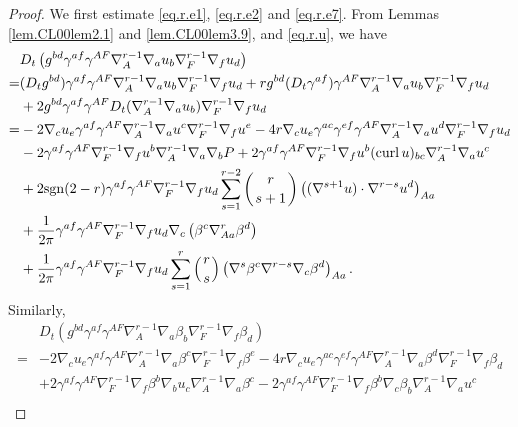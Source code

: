 \documentclass[12pt,reqno]{amsart}
\numberwithin{equation}{section}
\theoremstyle{definition}
\theoremstyle{remark}
\begin{document}
\begin{proof}
We first estimate  \eqref{eq.r.e1}, \eqref{eq.r.e2} and \eqref{eq.r.e7}.  From Lemmas \ref{lem.CL00lem2.1} and \ref{lem.CL00lem3.9}, and \eqref{eq.r.u}, we have
\begin{align*}
  &D_t\left(g^{bd}\gamma^{af}\gamma^{AF}{\nabla}_A^{r-1}{\nabla}_a u_b{\nabla}_F^{r-1}{\nabla}_f u_d\right)\\
  =&(D_tg^{bd})\gamma^{af}\gamma^{AF}{\nabla}_A^{r-1}{\nabla}_a u_b{\nabla}_F^{r-1}{\nabla}_f u_d+rg^{bd}(D_t\gamma^{af})\gamma^{AF}{\nabla}_A^{r-1}{\nabla}_a u_b{\nabla}_F^{r-1}{\nabla}_f u_d\\
  &+2g^{bd}\gamma^{af}\gamma^{AF}D_t({\nabla}_A^{r-1}{\nabla}_a u_b){\nabla}_F^{r-1}{\nabla}_f u_d\\
  =&-2{\nabla}_c u_e\gamma^{af}\gamma^{AF}{\nabla}_A^{r-1}{\nabla}_a u^c{\nabla}_F^{r-1}{\nabla}_f u^e-4r{\nabla}_c u_e\gamma^{ac}\gamma^{ef}\gamma^{AF}{\nabla}_A^{r-1}{\nabla}_a u^d{\nabla}_F^{r-1}{\nabla}_f u_d\\
  &-2\gamma^{af}\gamma^{AF}{\nabla}_F^{r-1}{\nabla}_f u^b{\nabla}_A^{r-1}{\nabla}_a{\nabla}_b{P } +2\gamma^{af}\gamma^{AF}{\nabla}_F^{r-1}{\nabla}_f u^b({\mathrm{curl}\,} u)_{bc}{\nabla}_A^{r-1}{\nabla}_a u^c\\
  &+2{\mathrm{sgn}}(2-r)\gamma^{af}\gamma^{AF}{\nabla}_F^{r-1}{\nabla}_f u_d\sum_{s=1}^{r-2}\left(r\atop s+1\right)\left(({\nabla}^{s+1}u)\cdot {\nabla}^{r-s}u^d\right)_{Aa}\\
  &+\frac{1}{2\pi}\gamma^{af}\gamma^{AF}{\nabla}_F^{r-1}{\nabla}_f u_d{\nabla}_c\left(\beta^c{\nabla}_{Aa}^r\beta^d\right)\\
  &+\frac{1}{2\pi}\gamma^{af}\gamma^{AF}{\nabla}_F^{r-1}{\nabla}_f u_d\sum_{s=1}^r\left(r\atop s\right) \left({\nabla}^s\beta^c{\nabla}^{r-s}{\nabla}_c \beta^d\right)_{Aa}.
\end{align*}
Similarly,
\begin{align*}
  &D_t\left(g^{bd}\gamma^{af}\gamma^{AF}{\nabla}_A^{r-1}{\nabla}_a \beta_b{\nabla}_F^{r-1}{\nabla}_f \beta_d\right)\\
  =&-2{\nabla}_c u_e\gamma^{af}\gamma^{AF}{\nabla}_A^{r-1}{\nabla}_a \beta^c{\nabla}_F^{r-1}{\nabla}_f \beta^e-4r{\nabla}_c u_e\gamma^{ac}\gamma^{ef}\gamma^{AF}{\nabla}_A^{r-1}{\nabla}_a \beta^d{\nabla}_F^{r-1}{\nabla}_f \beta_d\\
  &+2\gamma^{af}\gamma^{AF}{\nabla}_F^{r-1}{\nabla}_f \beta^b {\nabla}_bu_c{\nabla}_A^{r-1}{\nabla}_a\beta^c-2\gamma^{af}\gamma^{AF}{\nabla}_F^{r-1}{\nabla}_f \beta^b{\nabla}_c\beta_b{\nabla}_A^{r-1}{\nabla}_a u^c\\

\end{align*}
\end{proof}
\end{document}
